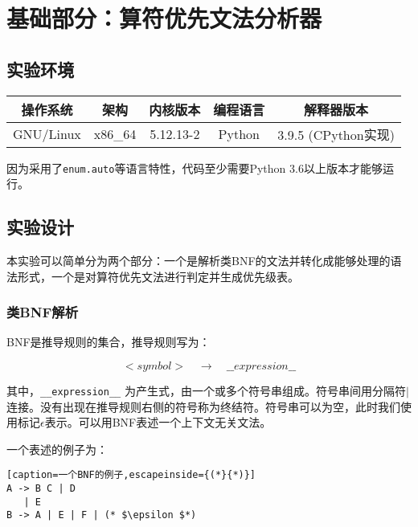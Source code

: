 \section{基础部分：算符优先文法分析器}

\subsection{实验环境}

\begin{table}[H]
  \centering
  \begin{tabular}{c|c|c|c|c}
  \hline
  操作系统      & 架构      & 内核版本    & 编程语言   & 解释器版本           \\ \hline
  GNU/Linux & x86\_64 & 5.12.13-2 & Python & 3.9.5 (CPython实现) \\ \hline
  \end{tabular}
\end{table}

因为采用了\texttt{enum.auto}等语言特性，代码至少需要Python 3.6以上版本才能够运行。

\subsection{实验设计}

本实验可以简单分为两个部分：一个是解析类BNF的文法并转化成能够处理的语法形式，一个是对算符优先文法进行判定并生成优先级表。

\subsubsection{类BNF解析}

BNF是推导规则的集合，推导规则写为：

\begin{equation}\nonumber
  <symbol>\quad \rightarrow\quad \_\_expression\_\_
\end{equation}

其中，\texttt{\_\_expression\_\_} 为产生式，由一个或多个符号串组成。符号串间用分隔符$\mid$连接。没有出现在推导规则右侧的符号称为终结符。符号串可以为空，此时我们使用标记$\epsilon$表示。可以用BNF表述一个上下文无关文法。

一个表述的例子为：

\begin{lstlisting}[caption=一个BNF的例子,escapeinside={(*}{*)}]
A -> B C | D
   | E
B -> A | E | F | (* $\epsilon $*)
\end{lstlisting}


